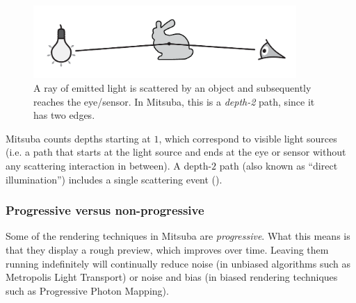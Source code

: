 \begin{figure}[h!]
\centering
\vspace{-5mm}
\includegraphics[width=10cm]{images/path_explanation.pdf}
\vspace{-5mm}
\caption{
	\label{fig:path-explanation}
	A ray of emitted light is scattered by an object and subsequently
	reaches the eye/sensor.
	In Mitsuba, this is a \emph{depth-2} path, since it has two edges.
}
\end{figure}
Mitsuba counts depths starting at $1$, which correspond to
visible light sources (i.e. a path that starts at the light
source and ends at the eye or sensor without any scattering
interaction in between).
A depth-$2$ path (also known as ``direct illumination'') includes
a single scattering event ().

\subsubsection*{Progressive versus non-progressive}
Some of the rendering techniques in Mitsuba are \emph{progressive}.
What this means is that they display a rough preview, which improves over time.
Leaving them running indefinitely will continually reduce noise (in unbiased algorithms
such as Metropolis Light Transport) or noise and bias (in biased
rendering techniques such as Progressive Photon Mapping).

